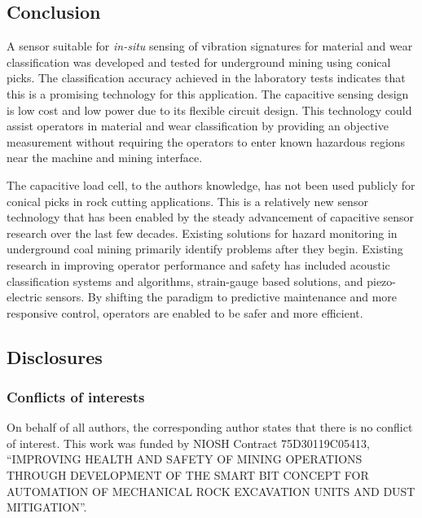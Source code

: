 \subsection{Conclusion}

A sensor suitable for \textit{in-situ} sensing of vibration signatures for material and wear classification
 was developed and tested for underground mining using conical picks. 
The classification accuracy achieved in the laboratory tests indicates that this is a promising 
 technology for this application.
The capacitive sensing design is low cost and low power due to its flexible circuit design.
This technology could assist operators in material and wear classification by providing an objective
 measurement without requiring the operators to enter known hazardous regions near the machine and mining interface.

The capacitive load cell, to the authors knowledge, has not been used publicly for conical picks in 
rock cutting applications. This is a relatively new sensor technology that has been enabled by the 
steady advancement of capacitive sensor research over the last few decades.
Existing solutions for hazard monitoring in underground coal mining primarily identify problems
after they begin. 
Existing research in improving operator performance
and safety has included acoustic classification systems and algorithms, strain-gauge based solutions, 
and piezo-electric sensors.
By shifting the paradigm to predictive maintenance and more responsive control,
 operators are enabled to be safer and more efficient. 

\subsection{Disclosures}

\subsubsection{Conflicts of interests}
On behalf of all authors, the corresponding author states that there is no conflict of interest. 
This work was funded by NIOSH Contract 75D30119C05413, ``IMPROVING HEALTH AND SAFETY OF MINING OPERATIONS
THROUGH DEVELOPMENT OF THE SMART BIT CONCEPT FOR AUTOMATION OF MECHANICAL ROCK EXCAVATION
 UNITS AND DUST MITIGATION''.


